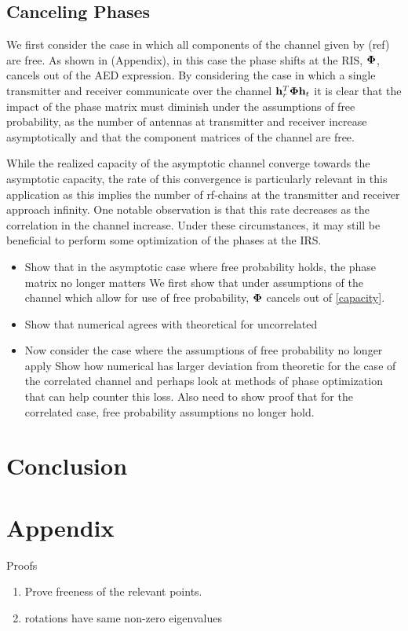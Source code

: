 \documentclass[12pt,a4paper]{report}
\begin{document}
\section{Canceling Phases}
We first consider the case in which all components of the channel given by (ref) are free. As shown in (Appendix), in this case the 
phase shifts at the RIS, $\boldsymbol{\Phi}$, cancels out of the AED expression. 
By considering the case in which a single transmitter and receiver communicate over the channel $\mathbf{h}_r^T \boldsymbol{\Phi} \mathbf{h}_t$ it is clear that
the impact of the phase matrix must diminish under the assumptions of free probability, \ie  as the number of antennas at transmitter and receiver increase asymptotically and that the component matrices of the channel are free. 
\par
While the realized capacity of the asymptotic channel converge towards the asymptotic capacity, the rate of this convergence is particularly relevant in this application as this implies the number of rf-chains at the transmitter and receiver approach infinity. One notable observation is that this rate
decreases as the correlation in the channel increase. Under these circumstances, it may still be beneficial to perform some optimization of the phases at the IRS. 
\begin{itemize}
\item 
	
	Show that in the asymptotic case where free probability holds, the phase matrix no longer matters
	We first show that under assumptions of the channel which allow for use of free probability, $\boldsymbol{\Phi}$
	cancels out of \eqref{capacity}.
	
\item
	Show that numerical agrees with theoretical for uncorrelated 
\item
	Now consider the case where the assumptions of free probability no longer apply 
	Show how numerical has larger deviation from theoretic for the case of the correlated channel and perhaps 
	look at methods of phase optimization that can help counter this loss. Also need to show proof that for the
	correlated case, free probability assumptions no longer hold. 
\end{itemize}



\chapter{Conclusion}

\chapter{Appendix}
Proofs
\begin{enumerate}
\item
	Prove freeness of the relevant points. 
\item 
	rotations have same non-zero eigenvalues
\end{enumerate}



\end{document}
